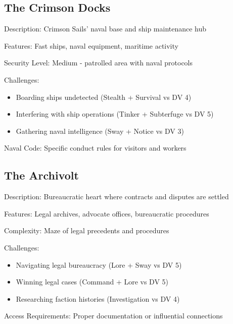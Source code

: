 \documentclass[11pt]{article}
\newenvironment{location}[1]{\begin{description}[leftmargin=*,style=standard]\item[\textbf{#1}]}{\end{description}}
\begin{document}
\subsection{The Crimson Docks}
\begin{location}{The Crimson Docks}
\item[Description:] Crimson Sails' naval base and ship maintenance hub
\item[Features:] Fast ships, naval equipment, maritime activity
\item[Security Level:] Medium - patrolled area with naval protocols
\item[Challenges:] 
  \begin{itemize}
    \item Boarding ships undetected (Stealth + Survival vs DV 4)
    \item Interfering with ship operations (Tinker + Subterfuge vs DV 5)
    \item Gathering naval intelligence (Sway + Notice vs DV 3)
  \end{itemize}
\item[Naval Code:] Specific conduct rules for visitors and workers
\end{location}

\subsection{The Archivolt}
\begin{location}{The Archivolt}
\item[Description:] Bureaucratic heart where contracts and disputes are settled
\item[Features:] Legal archives, advocate offices, bureaucratic procedures
\item[Complexity:] Maze of legal precedents and procedures
\item[Challenges:] 
  \begin{itemize}
    \item Navigating legal bureaucracy (Lore + Sway vs DV 5)
    \item Winning legal cases (Command + Lore vs DV 5)
    \item Researching faction histories (Investigation vs DV 4)
  \end{itemize}
\item[Access Requirements:] Proper documentation or influential connections
\end{location}
\end{document}
